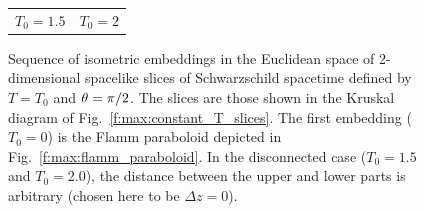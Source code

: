 \begin{figure}
\begin{center}
\begin{tabular}{cc}
$T_0=1.5$ & $T_0=2$
\end{tabular}
\end{center}
\caption[]{\label{f:max:embeddings} \footnotesize
Sequence of isometric embeddings in the Euclidean space
of 2-dimensional spacelike slices of Schwarzschild spacetime defined by
$T=T_0$ and $\theta=\pi/2$. The slices are those shown in the Kruskal diagram
of Fig.~\ref{f:max:constant_T_slices}. The first embedding ($T_0=0$) is the
Flamm paraboloid depicted in Fig.~\ref{f:max:flamm_paraboloid}.
In the disconnected case ($T_0=1.5$ and $T_0=2.0$),
the distance
between the upper and lower parts is arbitrary (chosen here to be $\Delta z = 0$).}
\end{figure}


